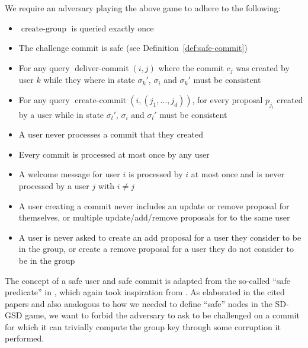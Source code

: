 \begin{definition}
	We require an adversary playing the above game to adhere to the following:
	\begin{itemize}
		\item $\operatorname{create-group}$ is queried exactly once
		\item The challenge commit is safe (see Definition~\vref{def:safe-commit})
		\item For any query $\operatorname{deliver-commit}(i, j)$ where the commit $c_j$ was created by user $k$ while they where in state $\sigma_k'$, $\sigma_i$ and $\sigma_k'$ must be consistent
		\item For any query $\operatorname{create-commit}(i, (j_1, \ldots, j_d))$, for every proposal $p_{j_l}$ created by a user while in state $\sigma_l'$, $\sigma_i$ and $\sigma_l'$ must be consistent
		\item A user never processes a commit that they created
		\item Every commit is processed at most once by any user
		\item A welcome message for user $i$ is processed by $i$ at most once and is never processed by a user $j$ with $i \neq j$
		\item A user creating a commit never includes an update or remove proposal for themselves, or multiple update/add/remove proposals for to the same user
		\item A user is never asked to create an add proposal for a user they consider to be in the group, or create a remove proposal for a user they do not consider to be in the group
	\end{itemize}
\end{definition}

The concept of a safe user and safe commit is adapted from the so-called ``safe predicate'' in \cite{ttkem}, which again took inspiration from \cite{rtreekem}. As elaborated in the cited papers and also analogous to how we needed to define ``safe'' nodes in the SD-GSD game, we want to forbid the adversary to ask to be challenged on a commit for which it can trivially compute the group key through some corruption it performed.

